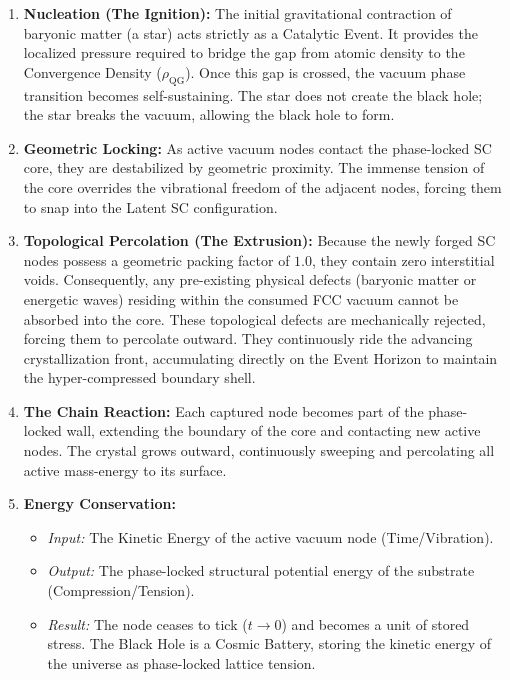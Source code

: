 \begin{enumerate}
    \item \textbf{Nucleation (The Ignition):} The initial gravitational contraction of baryonic matter (a star) acts strictly as a Catalytic Event. It provides the localized pressure required to bridge the gap from atomic density to the Convergence Density ($\rho_{\mathrm{QG}}$). Once this gap is crossed, the vacuum phase transition becomes self-sustaining. The star does not create the black hole; the star breaks the vacuum, allowing the black hole to form.
    \item \textbf{Geometric Locking:} As active vacuum nodes contact the phase-locked SC core, they are destabilized by geometric proximity. The immense tension of the core overrides the vibrational freedom of the adjacent nodes, forcing them to snap into the Latent SC configuration.
    \item \textbf{Topological Percolation (The Extrusion):} Because the newly forged SC nodes possess a geometric packing factor of $1.0$, they contain zero interstitial voids. Consequently, any pre-existing physical defects (baryonic matter or energetic waves) residing within the consumed FCC vacuum cannot be absorbed into the core. These topological defects are mechanically rejected, forcing them to percolate outward. They continuously ride the advancing crystallization front, accumulating directly on the Event Horizon to maintain the hyper-compressed boundary shell.
    \item \textbf{The Chain Reaction:} Each captured node becomes part of the phase-locked wall, extending the boundary of the core and contacting new active nodes. The crystal grows outward, continuously sweeping and percolating all active mass-energy to its surface.
    \item \textbf{Energy Conservation:} 
    \begin{itemize}
        \item \textit{Input:} The Kinetic Energy of the active vacuum node (Time/Vibration).
        \item \textit{Output:} The phase-locked structural potential energy of the substrate (Compression/Tension).
        \item \textit{Result:} The node ceases to tick ($t \to 0$) and becomes a unit of stored stress. The Black Hole is a Cosmic Battery, storing the kinetic energy of the universe as phase-locked lattice tension.
    \end{itemize}
\end{enumerate}

